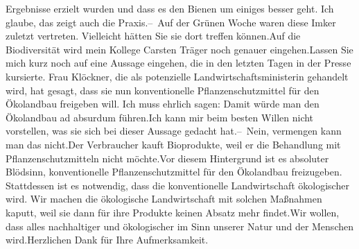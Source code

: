 \documentclass{article}
\begin{document}
Ergebnisse erzielt wurden und dass es den Bienen um einiges besser geht. Ich glaube, das zeigt auch die Praxis.– Auf der Grünen Woche waren diese Imker zuletzt vertreten. Vielleicht hätten Sie sie dort treffen können.Auf die Biodiversität wird mein Kollege Carsten Träger noch genauer eingehen.Lassen Sie mich kurz noch auf eine Aussage eingehen, die in den letzten Tagen in der Presse kursierte. Frau Klöckner, die als potenzielle Landwirtschaftsministerin gehandelt wird, hat gesagt, dass sie nun konventionelle Pflanzenschutzmittel für den Ökolandbau freigeben will. Ich muss ehrlich sagen: Damit würde man den Ökolandbau ad absurdum führen.Ich kann mir beim besten Willen nicht vorstellen, was sie sich bei dieser Aussage gedacht hat.– Nein, vermengen kann man das nicht.Der Verbraucher kauft Bioprodukte, weil er die Behandlung mit Pflanzenschutzmitteln nicht möchte.Vor diesem Hintergrund ist es absoluter Blödsinn, konventionelle Pflanzenschutzmittel für den Ökolandbau freizugeben. Stattdessen ist es notwendig, dass die konventionelle Landwirtschaft ökologischer wird. Wir machen die ökologische Landwirtschaft mit solchen Maßnahmen kaputt, weil sie dann für ihre Produkte keinen Absatz mehr findet.Wir wollen, dass alles nachhaltiger und ökologischer im Sinn unserer Natur und der Menschen wird.Herzlichen Dank für Ihre Aufmerksamkeit.
\end{document}
